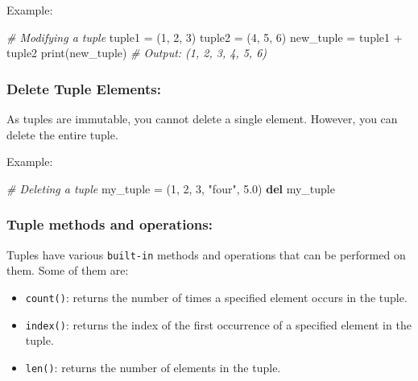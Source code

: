 \documentclass[11pt]{article}
\providecommand{\tightlist}{%
      \setlength{\itemsep}{0pt}\setlength{\parskip}{0pt}}
\newenvironment{Shaded}{}{}
\newcommand{\KeywordTok}[1]{\textcolor[rgb]{0.00,0.44,0.13}{\textbf{{#1}}}}
\newcommand{\DecValTok}[1]{\textcolor[rgb]{0.25,0.63,0.44}{{#1}}}
\newcommand{\FloatTok}[1]{\textcolor[rgb]{0.25,0.63,0.44}{{#1}}}
\newcommand{\StringTok}[1]{\textcolor[rgb]{0.25,0.44,0.63}{{#1}}}
\newcommand{\CommentTok}[1]{\textcolor[rgb]{0.38,0.63,0.69}{\textit{{#1}}}}
\newcommand{\NormalTok}[1]{{#1}}
\newcommand{\OperatorTok}[1]{\textcolor[rgb]{0.40,0.40,0.40}{{#1}}}
\newcommand{\BuiltInTok}[1]{{#1}}
\begin{document}
Example:

\begin{Shaded}
\begin{Highlighting}[]
\CommentTok{\# Modifying a tuple}
\NormalTok{tuple1 }\OperatorTok{=}\NormalTok{ (}\DecValTok{1}\NormalTok{, }\DecValTok{2}\NormalTok{, }\DecValTok{3}\NormalTok{)}
\NormalTok{tuple2 }\OperatorTok{=}\NormalTok{ (}\DecValTok{4}\NormalTok{, }\DecValTok{5}\NormalTok{, }\DecValTok{6}\NormalTok{)}
\NormalTok{new\_tuple }\OperatorTok{=}\NormalTok{ tuple1 }\OperatorTok{+}\NormalTok{ tuple2}
\BuiltInTok{print}\NormalTok{(new\_tuple)  }\CommentTok{\# Output: (1, 2, 3, 4, 5, 6)}
\end{Highlighting}
\end{Shaded}

\hypertarget{delete-tuple-elements}{%
\subsubsection{Delete Tuple Elements:}\label{delete-tuple-elements}}

As tuples are immutable, you cannot delete a single element. However,
you can delete the entire tuple.

Example:

\begin{Shaded}
\begin{Highlighting}[]
\CommentTok{\# Deleting a tuple}
\NormalTok{my\_tuple }\OperatorTok{=}\NormalTok{ (}\DecValTok{1}\NormalTok{, }\DecValTok{2}\NormalTok{, }\DecValTok{3}\NormalTok{, }\StringTok{"four"}\NormalTok{, }\FloatTok{5.0}\NormalTok{)}
\KeywordTok{del}\NormalTok{ my\_tuple}
\end{Highlighting}
\end{Shaded}

\hypertarget{tuple-methods-and-operations}{%
\subsubsection{Tuple methods and
operations:}\label{tuple-methods-and-operations}}

Tuples have various \texttt{built-in} methods and operations that can be
performed on them. Some of them are:

\begin{itemize}
\tightlist
\item
  \texttt{count()}: returns the number of times a specified element
  occurs in the tuple.
\item
  \texttt{index()}: returns the index of the first occurrence of a
  specified element in the tuple.
\item
  \texttt{len()}: returns the number of elements in the tuple.
\end{itemize}
\end{document}
